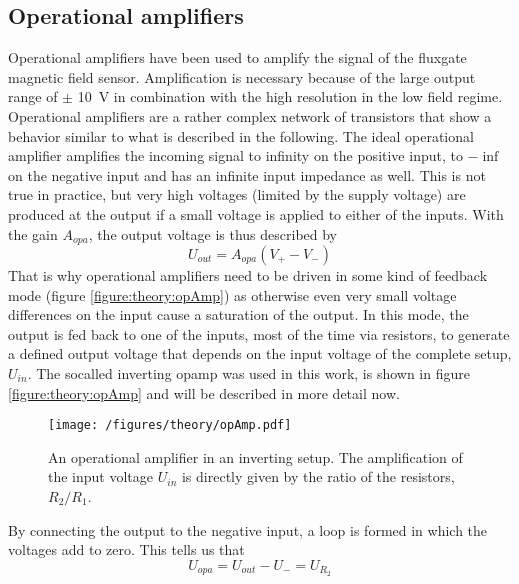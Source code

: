             \subsection{Operational amplifiers}
                Operational amplifiers have been used to amplify the signal of the fluxgate magnetic field sensor. Amplification is necessary because of the large output range of $\pm$ \SI{10}{\volt} in combination with the high resolution in the low field regime. Operational amplifiers are a rather complex network of transistors that show a behavior similar to what is described in the following. The ideal operational amplifier amplifies the incoming signal to infinity on the positive input, to $-\inf$ on the negative input and has an infinite input impedance as well. This is not true in practice, but very high voltages (limited by the supply voltage) are produced at the output if a small voltage is applied to either of the inputs. With the gain $A_{opa}$, the output voltage is thus described by
                \begin{equation}
                        \label{equation:theory:OPAvoltage}
                    U_{out} = A_{opa}(V_+ - V_-)
                \end{equation}
                That is why operational amplifiers need to be driven in some kind of feedback mode (figure \ref{figure:theory:opAmp}) as otherwise even very small voltage differences on the input cause a saturation of the output. In this mode, the output is fed back to one of the inputs, most of the time via resistors, to generate a defined output voltage that depends on the input voltage of the complete setup, $U_{in}$. The socalled inverting opamp was used in this work, is shown in figure \ref{figure:theory:opAmp} and will be described in more detail now.
                \begin{figure}
                    \texttt{[image: /figures/theory/opAmp.pdf]}
                    \caption[Operational amplifier]{An operational amplifier in an inverting setup. The amplification of the input voltage $U_{in}$ is directly given by the ratio of the resistors, $R_2/R_1$.}
                \end{figure}
                By connecting the output to the negative input, a loop is formed in which the voltages add to zero. This tells us that
                \begin{equation*}
                    U_{opa} = U_{out} - U_- = U_{R_2}
                \end{equation*}
